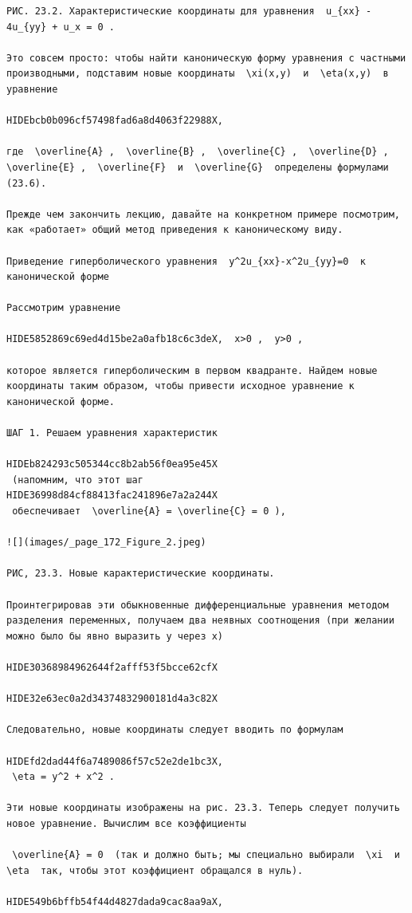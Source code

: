 \documentclass[
  ukrainian,
]{article}
\begin{document}
\begin{verbatim}
РИС. 23.2. Характеристические координаты для уравнения  u_{xx} - 4u_{yy} + u_x = 0 .

Это совсем просто: чтобы найти каноническую форму уравнения с частными производными, подставим новые координаты  \xi(x,y)  и  \eta(x,y)  в уравнение

HIDEbcb0b096cf57498fad6a8d4063f22988X,

где  \overline{A} ,  \overline{B} ,  \overline{C} ,  \overline{D} ,  \overline{E} ,  \overline{F}  и  \overline{G}  определены формулами (23.6).

Прежде чем закончить лекцию, давайте на конкретном примере посмотрим, как «работает» общий метод приведения к каноническому виду.

Приведение гиперболического уравнения  y^2u_{xx}-x^2u_{yy}=0  к канонической форме

Рассмотрим уравнение

HIDE5852869c69ed4d15be2a0afb18c6c3deX,  x>0 ,  y>0 ,

которое является гиперболическим в первом квадранте. Найдем новые координаты таким образом, чтобы привести исходное уравнение к канонической форме.

ШАГ 1. Решаем уравнения характеристик

HIDEb824293c505344cc8b2ab56f0ea95e45X
 (напомним, что этот шаг 
HIDE36998d84cf88413fac241896e7a2a244X
 обеспечивает  \overline{A} = \overline{C} = 0 ),

![](images/_page_172_Figure_2.jpeg)

РИС, 23.3. Новые карактеристические координаты.

Проинтегрировав эти обыкновенные дифференциальные уравнения методом разделения переменных, получаем два неявных соотнощения (при желании можно было бы явно выразить у через х)

HIDE30368984962644f2afff53f5bcce62cfX

HIDE32e63ec0a2d34374832900181d4a3c82X

Следовательно, новые координаты следует вводить по формулам

HIDEfd2dad44f6a7489086f57c52e2de1bc3X,  
 \eta = y^2 + x^2 .

Эти новые координаты изображены на рис. 23.3. Теперь следует получить новое уравнение. Вычислим все коэффициенты

 \overline{A} = 0  (так и должно быть; мы специально выбирали  \xi  и  \eta  так, чтобы этот коэффициент обращался в нуль).

HIDE549b6bffb54f44d4827dada9cac8aa9aX,


\end{verbatim}
\end{document}
